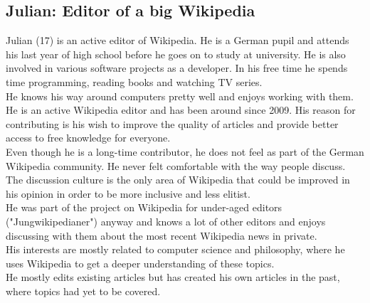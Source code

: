 \subsection{Julian: Editor of a big Wikipedia}
Julian (17) is an active editor of Wikipedia. He is a German pupil and attends his last year of high school before he goes on to study at university. He is also involved in various software projects as a developer. In his free time he spends time programming, reading books and watching TV series. \\
He knows his way around computers pretty well and enjoys working with them. \\
He is an active Wikipedia editor and has been around since 2009. His reason for contributing is his wish to improve the quality of articles and provide better access to free knowledge for everyone. \\
Even though he is a long-time contributor, he does not feel as part of the German Wikipedia community. He never felt comfortable with the way people discuss. The discussion culture is the only area of Wikipedia that could be improved in his opinion in order to be more inclusive and less elitist. \\
He was part of the project on Wikipedia for under-aged editors ("Jungwikipedianer") anyway and knows a lot of other editors and enjoys discussing with them about the most recent Wikipedia news in private. \\
His interests are mostly related to computer science and philosophy, where he uses Wikipedia to get a deeper understanding of these topics. \\
He mostly edits existing articles but has created his own articles in the past, where topics had yet to be covered.

